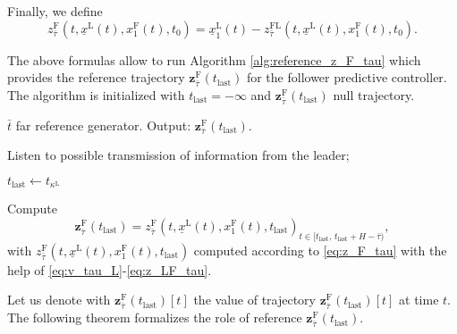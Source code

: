 \documentclass[letterpaper, 10 pt, conference]{ieeeconf}
\theoremstyle{definition}
\theoremstyle{nopoint}
\begin{document}
Finally, we define 
\begin{equation}\label{eq:z_F_tau}
z_{\bar{\tau}}^\mathrm{F}(t,\underline{x}^\mathrm{L}(t),x_1^\mathrm{F}(t),t_0)=\underline{x}_1^\mathrm{L}(t)-z^{\mathrm{FL}}_{\bar{\tau}} (t,\underline{x}^\mathrm{L}(t),x_1^\mathrm{F}(t),t_0).
\end{equation}

 
The above formulas allow to run Algorithm \ref{alg:reference_z_F_tau} which provides the reference trajectory $\mathbf{z}_{\bar{\tau}}^\mathrm{F}(t_{\mathrm{last}})$ for the follower predictive controller. The algorithm is initialized with $t_{\mathrm{last}}=-\infty$ and  $\mathbf{z}_{\bar{\tau}}^\mathrm{F}(t_{\mathrm{last}})$ null trajectory. 
 
 

\begin{algorithm}
\caption{$\bar{t}$ far reference generator. Output: $\mathbf{z}_{\bar{\tau}}^\mathrm{F}(t_{\mathrm{last}})$. }\label{alg:reference_z_F_tau}
\begin{algorithmic}[1]
\Loop

\State Listen to possible transmission of information from the leader;

 
\State $t_{\mathrm{last}} \leftarrow t_{\kappa^\mathrm{L}}$

\State Compute
\begin{equation}\label{eq:reference_z_F_tau}
 \mathbf{z}_{\bar{\tau}}^\mathrm{F}(t_{\mathrm{last}})={z_{\bar{\tau}}^\mathrm{F}(t,\underline{x}^\mathrm{L}(t),x_1^\mathrm{F}(t),t_{\mathrm{last}})}_{t\in [t_{\mathrm{last}}, \, t_{\mathrm{last}}+H-\bar{\tau} )},
\end{equation}
with $z_{\bar{\tau}}^\mathrm{F}(t,\underline{x}^\mathrm{L}(t),x_1^\mathrm{F}(t),t_{\mathrm{last}})$ computed according to \eqref{eq:z_F_tau} with the help of \eqref{eq:v_tau_L}\--\eqref{eq:z_LF_tau}.


\EndIf


\EndLoop

\end{algorithmic}
\end{algorithm}

 
Let us denote with  $\mathbf{z}_{\bar{\tau}}^\mathrm{F}(t_{\mathrm{last}})[t]$ the value of trajectory $\mathbf{z}_{\bar{\tau}}^\mathrm{F}(t_{\mathrm{last}})[t]$ at time $t$.
The following theorem formalizes the role of reference $\mathbf{z}_{\bar{\tau}}^\mathrm{F}(t_{\mathrm{last}})$. 
\end{document}
